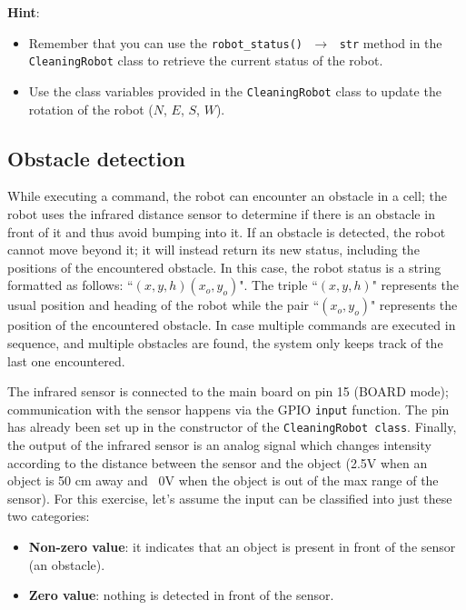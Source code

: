 \noindent\textbf{Hint}:
\begin{itemize}
    \item Remember that you can use the \texttt{robot\_status() $\,\to\,$ str} method in the \texttt{CleaningRobot} class to retrieve the current status of the robot.
    \item Use the class variables provided in the \texttt{CleaningRobot} class to update the rotation of the robot ($N$, $E$, $S$, $W$).
\end{itemize}


\subsection{Obstacle detection}
While executing a command, the robot can encounter an obstacle in a cell;  the robot uses the infrared distance sensor to determine if there is an obstacle in front of it and thus avoid bumping into it. 
If an obstacle is detected, the robot cannot move beyond it; it will instead return its new status, including the positions of the encountered obstacle. In this case, the robot status is a string formatted as follows: ``$(x,y,h)(x_o,y_o)$". The triple ``$(x,y,h)$" represents the usual position and heading of the robot while the pair ``$(x_o,y_o)$" represents the position of the encountered obstacle.
In case multiple commands are executed in sequence, and multiple obstacles are found, the system only keeps track of the last one encountered.

The infrared sensor is connected to the main board on pin 15 (BOARD mode); communication with the sensor happens via the GPIO \texttt{input} function. The pin has already been set up in the constructor of the \texttt{CleaningRobot class}. 
Finally, the output of the infrared sensor is an analog signal which changes intensity according to the distance between the sensor and the object (\ie 2.5V when an object is 50 cm away and ~0V when the object is out of the max range of the sensor). For this exercise, let's assume the input can be classified into just these two categories:
\begin{itemize}
    \item \textbf{Non-zero value}: it indicates that an object is present in front of the sensor (\ie an obstacle).
    \item \textbf{Zero value}: nothing is detected in front of the sensor.
\end{itemize}

